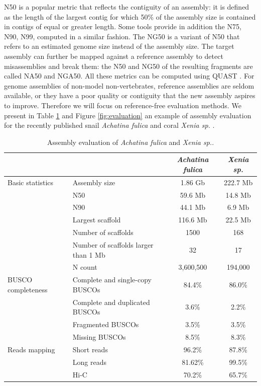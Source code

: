 N50 is a popular metric that reflects the contiguity of an assembly: it is defined as the length of the largest contig for which 50\% of the assembly size is contained in contigs of equal or greater length. Some tools provide in addition the N75, N90, N99, computed in a similar fashion. The NG50 is a variant of N50 that refers to an estimated genome size instead of the assembly size. The target assembly can further be mapped against a reference assembly to detect misassemblies and break them: the N50 and NG50 of the resulting fragments are called NA50 and NGA50. All these metrics can be computed using QUAST \cite{quast}. For genome assemblies of non-model non-vertebrates, reference assemblies are seldom available, or they have a poor quality or contiguity that the new assembly aspires to improve. Therefore we will focus on reference-free evaluation methods. We present in Table \ref{tab:assembly_stats} and Figure \ref{fig:evaluation} an example of assembly evaluation for the recently published snail \textit{Achatina fulica} \cite{achatina_fulica} and coral \textit{Xenia sp.} \cite{xenia_sp}. \\

\begin{table}
\centering
\caption{Assembly evaluation of \textit{Achatina fulica} and \textit{Xenia sp.}.}
\begin{tabular}{|l|l|c|c|}
\hline
                &  & \textit{Achatina fulica} & \textit{Xenia sp.} \\
\hline
Basic statistics & Assembly size & 1.86 Gb & 222.7 Mb \\
                & N50 & 59.6 Mb & 14.8 Mb \\
                & N90 & 44.1 Mb & 6.9 Mb \\
                & Largest scaffold & 116.6 Mb & 22.5 Mb \\
                & Number of scaffolds & 1500 & 168 \\
                & Number of scaffolds larger than 1 Mb & 32 & 17 \\
                & N count & 3,600,500 & 194,000 \\
\hline
BUSCO completeness & Complete and single-copy BUSCOs & 84.4\% & 86.0\% \\
                & Complete and duplicated BUSCOs & 3.6\% & 2.2\% \\
                & Fragmented BUSCOs & 3.5\% & 3.5\% \\
                & Missing BUSCOs & 8.5\% & 8.3\% \\
\hline
Reads mapping & Short reads & 96.2\% & 87.8\% \\
                & Long reads & 81.62\% & 99.5\% \\
                & Hi-C & 70.2\% & 65.7\% \\
\hline
\end{tabular}
\label{tab:assembly_stats}
\end{table}

